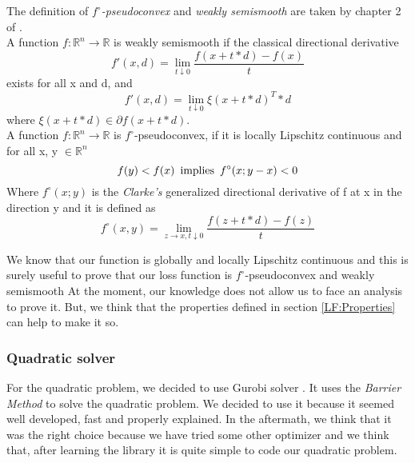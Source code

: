 The definition of \textit{$f^{\circ}$-pseudoconvex} and \textit{weakly semismooth} are taken by chapter 2 of \cite{PBM}.\\
A function $f : \mathbb{R}^n \rightarrow \mathbb{R}$ is weakly semismooth if the classical directional derivative
\begin{equation}
f'(x,d)=\lim_{t\downarrow 0}\frac{f(x+t*d)-f(x)}{t}
\end{equation}
exists for all x and d, and
\begin{equation}
f'(x,d)=\lim_{t\downarrow 0}\xi(x+t*d)^{T}*d
\end{equation}
where $\xi(x + t*d) \in \partial f (x + t*d)$. 
\\
A function $f : \mathbb{R}^n \rightarrow \mathbb{R}$ is $f^{\circ}$-pseudoconvex, if it is locally Lipschitz continuous and for all x, y $\in \mathbb{R}^n$
\begin{equation}
f(y)<f(x) \, \textnormal{ implies } \, f^{\circ}(x;y-x)<0
\end{equation}
Where $f^{\circ}(x;y)$ is the \textit{Clarke’s} generalized directional derivative of f at x in the direction y and it is defined as
\begin{equation}
f^{\circ}(x,y)=\lim_{z\rightarrow x,t\downarrow 0}\frac{f(z+t*d)-f(z)}{t}
\end{equation}

We know that our function is globally and locally Lipschitz continuous and this is surely useful to prove that our loss function is $f^{\circ}$-pseudoconvex and weakly semismooth
At the moment, our knowledge does not allow us to face an analysis to prove it. But, we think that the properties defined in section \ref{LF:Properties} can help to make it so. 

\subsubsection{Quadratic solver}
For the quadratic problem, we decided to use Gurobi solver \cite{Gurobi}. It uses the \textit{Barrier Method} to solve the quadratic problem. We decided to use it because it seemed well developed, fast and properly explained. In the aftermath, we think that it was the right choice because we have tried some other optimizer and we think that, after learning the library it is quite simple to code our quadratic problem.